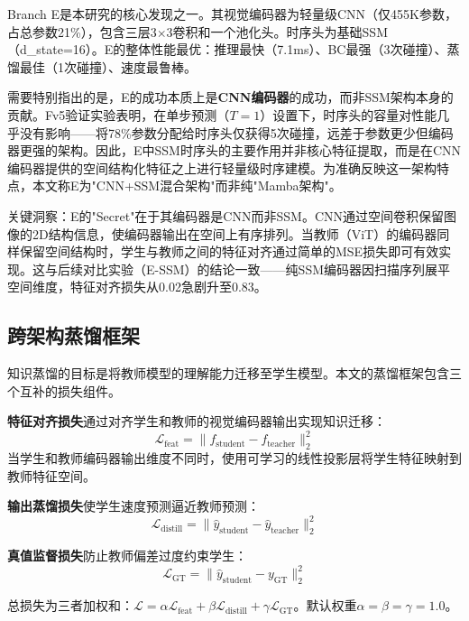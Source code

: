 \documentclass[12pt,a4paper]{article}
\numberwithin{equation}{section}
\numberwithin{figure}{section}
\numberwithin{table}{section}
\begin{document}
Branch E是本研究的核心发现之一。其视觉编码器为轻量级CNN（仅455K参数，占总参数21\%），包含三层3$\times$3卷积和一个池化头。时序头为基础SSM（d\_state=16）。E的整体性能最优：推理最快（7.1ms）、BC最强（3次碰撞）、蒸馏最佳（1次碰撞）、速度最鲁棒。

需要特别指出的是，E的成功本质上是\textbf{CNN编码器}的成功，而非SSM架构本身的贡献。Fv5验证实验表明，在单步预测（$T=1$）设置下，时序头的容量对性能几乎没有影响——将78\%参数分配给时序头仅获得5次碰撞，远差于参数更少但编码器更强的架构。因此，E中SSM时序头的主要作用并非核心特征提取，而是在CNN编码器提供的空间结构化特征之上进行轻量级时序建模。为准确反映这一架构特点，本文称E为"CNN+SSM混合架构"而非纯"Mamba架构"。

关键洞察：E的"Secret"在于其编码器是CNN而非SSM。CNN通过空间卷积保留图像的2D结构信息，使编码器输出在空间上有序排列。当教师（ViT）的编码器同样保留空间结构时，学生与教师之间的特征对齐通过简单的MSE损失即可有效实现。这与后续对比实验（E-SSM）的结论一致——纯SSM编码器因扫描序列展平空间维度，特征对齐损失从0.02急剧升至0.83。

\subsection{跨架构蒸馏框架}

知识蒸馏的目标是将教师模型的理解能力迁移至学生模型。本文的蒸馏框架包含三个互补的损失组件。

\textbf{特征对齐损失}通过对齐学生和教师的视觉编码器输出实现知识迁移：
\begin{equation}
\mathcal{L}_{\text{feat}} = \|f_{\text{student}} - f_{\text{teacher}}\|_2^2
\end{equation}
当学生和教师编码器输出维度不同时，使用可学习的线性投影层将学生特征映射到教师特征空间。

\textbf{输出蒸馏损失}使学生速度预测逼近教师预测：
\begin{equation}
\mathcal{L}_{\text{distill}} = \|\hat{y}_{\text{student}} - \hat{y}_{\text{teacher}}\|_2^2
\end{equation}

\textbf{真值监督损失}防止教师偏差过度约束学生：
\begin{equation}
\mathcal{L}_{\text{GT}} = \|\hat{y}_{\text{student}} - y_{\text{GT}}\|_2^2
\end{equation}

总损失为三者加权和：$\mathcal{L} = \alpha\mathcal{L}_{\text{feat}} + \beta\mathcal{L}_{\text{distill}} + \gamma\mathcal{L}_{\text{GT}}$。默认权重$\alpha=\beta=\gamma=1.0$。
\end{document}
